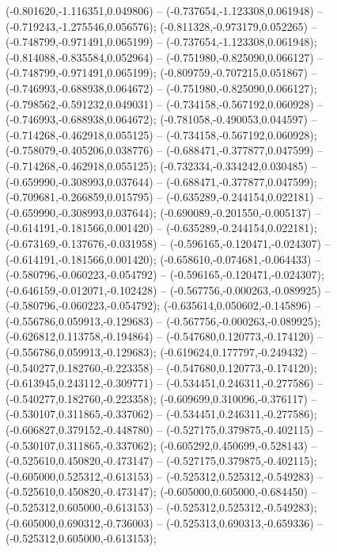  (-0.801620,-1.116351,0.049806) -- (-0.737654,-1.123308,0.061948) -- (-0.719243,-1.275546,0.056576);
 (-0.811328,-0.973179,0.052265) -- (-0.748799,-0.971491,0.065199) -- (-0.737654,-1.123308,0.061948);
 (-0.814088,-0.835584,0.052964) -- (-0.751980,-0.825090,0.066127) -- (-0.748799,-0.971491,0.065199);
 (-0.809759,-0.707215,0.051867) -- (-0.746993,-0.688938,0.064672) -- (-0.751980,-0.825090,0.066127);
 (-0.798562,-0.591232,0.049031) -- (-0.734158,-0.567192,0.060928) -- (-0.746993,-0.688938,0.064672);
 (-0.781058,-0.490053,0.044597) -- (-0.714268,-0.462918,0.055125) -- (-0.734158,-0.567192,0.060928);
 (-0.758079,-0.405206,0.038776) -- (-0.688471,-0.377877,0.047599) -- (-0.714268,-0.462918,0.055125);
 (-0.732334,-0.334242,0.030485) -- (-0.659990,-0.308993,0.037644) -- (-0.688471,-0.377877,0.047599);
 (-0.709681,-0.266859,0.015795) -- (-0.635289,-0.244154,0.022181) -- (-0.659990,-0.308993,0.037644);
 (-0.690089,-0.201550,-0.005137) -- (-0.614191,-0.181566,0.001420) -- (-0.635289,-0.244154,0.022181);
 (-0.673169,-0.137676,-0.031958) -- (-0.596165,-0.120471,-0.024307) -- (-0.614191,-0.181566,0.001420);
 (-0.658610,-0.074681,-0.064433) -- (-0.580796,-0.060223,-0.054792) -- (-0.596165,-0.120471,-0.024307);
 (-0.646159,-0.012071,-0.102428) -- (-0.567756,-0.000263,-0.089925) -- (-0.580796,-0.060223,-0.054792);
 (-0.635614,0.050602,-0.145896) -- (-0.556786,0.059913,-0.129683) -- (-0.567756,-0.000263,-0.089925);
 (-0.626812,0.113758,-0.194864) -- (-0.547680,0.120773,-0.174120) -- (-0.556786,0.059913,-0.129683);
 (-0.619624,0.177797,-0.249432) -- (-0.540277,0.182760,-0.223358) -- (-0.547680,0.120773,-0.174120);
 (-0.613945,0.243112,-0.309771) -- (-0.534451,0.246311,-0.277586) -- (-0.540277,0.182760,-0.223358);
 (-0.609699,0.310096,-0.376117) -- (-0.530107,0.311865,-0.337062) -- (-0.534451,0.246311,-0.277586);
 (-0.606827,0.379152,-0.448780) -- (-0.527175,0.379875,-0.402115) -- (-0.530107,0.311865,-0.337062);
 (-0.605292,0.450699,-0.528143) -- (-0.525610,0.450820,-0.473147) -- (-0.527175,0.379875,-0.402115);
 (-0.605000,0.525312,-0.613153) -- (-0.525312,0.525312,-0.549283) -- (-0.525610,0.450820,-0.473147);
 (-0.605000,0.605000,-0.684450) -- (-0.525312,0.605000,-0.613153) -- (-0.525312,0.525312,-0.549283);
 (-0.605000,0.690312,-0.736003) -- (-0.525313,0.690313,-0.659336) -- (-0.525312,0.605000,-0.613153);
